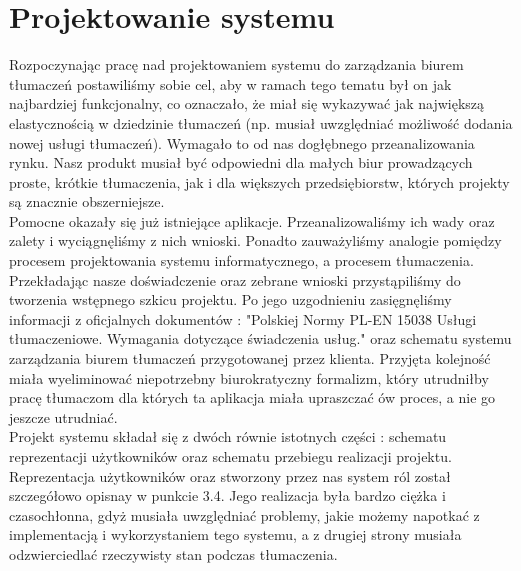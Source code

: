\documentclass[licencjacka]{pracamgr}
\begin{document}
\section{Projektowanie systemu}
Rozpoczynając pracę nad projektowaniem systemu do zarządzania biurem tłumaczeń postawiliśmy sobie cel, aby w ramach tego tematu był on jak najbardziej funkcjonalny,
co oznaczało, że miał się wykazywać jak największą elastycznością w dziedzinie tłumaczeń (np. musiał uwzględniać możliwość dodania nowej usługi tłumaczeń). 
Wymagało to od nas dogłębnego przeanalizowania rynku. Nasz produkt musiał być odpowiedni dla małych biur prowadzących proste, krótkie tłumaczenia, jak i dla większych 
przedsiębiorstw, których projekty są znacznie obszerniejsze.\\

Pomocne okazały się już istniejące aplikacje. Przeanalizowaliśmy ich wady oraz zalety i wyciągnęliśmy z nich wnioski. Ponadto zauważyliśmy analogie pomiędzy procesem projektowania
systemu informatycznego, a procesem tłumaczenia. Przekładając nasze doświadczenie oraz zebrane wnioski przystąpiliśmy do tworzenia wstępnego szkicu projektu. 
Po jego uzgodnieniu zasięgnęliśmy informacji z oficjalnych dokumentów : "Polskiej Normy PL-EN 15038 Usługi tłumaczeniowe. Wymagania dotyczące świadczenia usług." oraz
schematu systemu zarządzania biurem tłumaczeń przygotowanej przez klienta.
Przyjęta kolejność miała wyeliminować niepotrzebny biurokratyczny formalizm, który utrudniłby pracę tłumaczom dla których ta aplikacja miała upraszczać ów proces, a nie go jeszcze utrudniać.\\

Projekt systemu składał się z dwóch równie istotnych części : schematu reprezentacji użytkowników oraz schematu przebiegu realizacji projektu.\\

Reprezentacja użytkowników oraz stworzony przez nas system ról został szczegółowo opisnay w punkcie 3.4. 
Jego realizacja była bardzo ciężka i czasochłonna, gdyż musiała uwzględniać problemy, jakie możemy napotkać z implementacją i wykorzystaniem tego systemu, 
a z drugiej strony musiała odzwierciedlać rzeczywisty stan podczas tłumaczenia.\\
\end{document}
